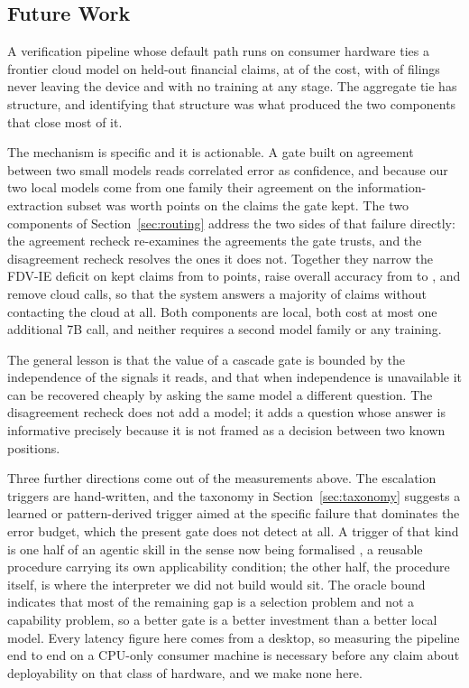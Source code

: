 \documentclass{article}
\begin{document}
\subsection{Future Work}

A verification pipeline whose default path runs on consumer hardware ties a frontier cloud
model on \nTest{} held-out financial claims, at \costRatioFull{} of the cost, with
\fullOnDeviceRate{} of filings never leaving the device and with no training at any stage.
The aggregate tie has structure, and identifying that structure was what produced the two
components that close most of it.

The mechanism is specific and it is actionable. A gate built on agreement between two small
models reads correlated error as confidence, and because our two local models come from one
family their agreement on the information-extraction subset was worth
\keptLocalIEGap{} points on the claims the gate kept. The two components of
Section~\ref{sec:routing} address the two sides of that failure directly: the agreement recheck
re-examines the agreements the gate trusts, and the disagreement recheck resolves the ones it
does not. Together they narrow the FDV-IE deficit on kept claims from \keptLocalIEGap{} to
\fullKeptLocalIEGap{} points, raise overall accuracy from \accRouted{} to \accFull{}, and
remove \arbKept{} cloud calls, so that the system answers a majority of claims without
contacting the cloud at all. Both components are local, both cost at most one additional 7B
call, and neither requires a second model family or any training.

The general lesson is that the value of a cascade gate is bounded by the independence of the
signals it reads, and that when independence is unavailable it can be recovered cheaply by
asking the same model a different question. The disagreement recheck does not add a model; it adds a
question whose answer is informative precisely because it is not framed as a decision
between two known positions.

Three further directions come out of the measurements above. The escalation triggers are
hand-written, and the taxonomy in Section~\ref{sec:taxonomy} suggests a learned or
pattern-derived trigger aimed at the specific failure that dominates the error budget, which
the present gate does not detect at all. A trigger of that kind is one half of an agentic
skill in the sense now being formalised \citep{jiang2026skills}, a reusable procedure
carrying its own applicability condition; the other half, the procedure itself, is where the
interpreter we did not build would sit. The oracle bound indicates that most of the
remaining gap is a selection problem and not a capability problem, so a better gate is a
better investment than a better local model. Every latency figure here comes from a desktop,
so measuring the pipeline end to end on a CPU-only consumer machine is necessary before any claim
about deployability on that class of hardware, and we make none here.
\end{document}
